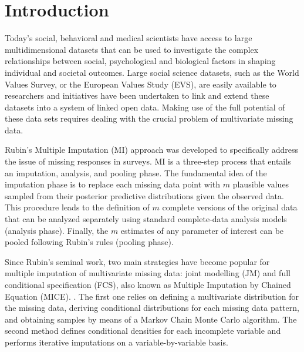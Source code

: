 \section{Introduction}


Today’s social, behavioral and medical scientists have access to large multidimensional datasets that can be
used to investigate the complex relationships between social, psychological and biological factors in 
shaping individual and societal outcomes.
Large social science datasets, such as the World Values Survey, or the European Values Study (EVS), 
are easily available to researchers and initiatives have been undertaken to link and extend these datasets 
into a system of linked open data.
Making use of the full potential of these data sets requires dealing with the crucial problem of multivariate
missing data.

Rubin's Multiple Imputation (MI) approach \citep{rubin:1987} was developed to specifically address the issue of missing 
responses in surveys.
MI is a three-step process that entails an imputation, analysis, and pooling phase.
The fundamental idea of the imputation phase is to replace each missing data point with $m$ plausible values sampled from 
their posterior predictive distributions given the observed data.
This procedure leads to the definition of $m$ complete versions of the original data that can be analyzed separately 
using standard complete-data analysis models (analysis phase).
Finally, the $m$ estimates of any parameter of interest can be pooled following Rubin's rules \citep{rubin:1987} 
(pooling phase).

Since Rubin's seminal work, two main strategies have become popular for multiple imputation of multivariate 
missing data: joint modelling (JM) \citep[ch. 4]{schafer:1997} and full conditional specification (FCS), also known 
as Multiple Imputation by Chained Equation (MICE).
\citep{vanBuurenEtAl:2006}.
The first one relies on defining a multivariate distribution for the missing data, deriving conditional
distributions for each missing data pattern, and obtaining samples by means of a Markov Chain Monte Carlo algorithm.
The second method defines conditional densities for each incomplete variable and performs iterative imputations on 
a variable-by-variable basis.


